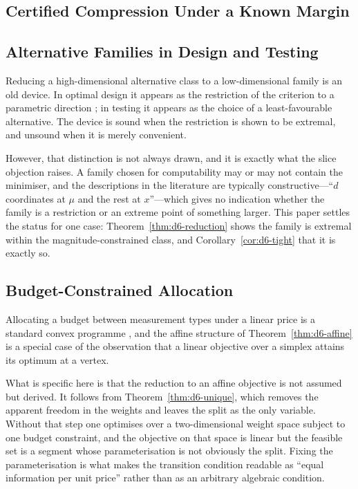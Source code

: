 \documentclass[conference]{IEEEtran}
\theoremstyle{definition}
\begin{document}
\subsection{Certified Compression Under a Known Margin}

\subsection{Alternative Families in Design and Testing}

Reducing a high-dimensional alternative class to a low-dimensional family is an old device.
In optimal design it appears as the restriction of the criterion to a parametric direction
\cite{pukelsheim2006,fedorov1972}; in testing it appears as the choice of a least-favourable
alternative. The device is sound when the restriction is shown to be extremal, and unsound
when it is merely convenient.

However, that distinction is not always drawn, and it is exactly what the slice objection
raises. A family chosen for computability may or may not contain the minimiser, and the
descriptions in the literature are typically constructive---``$d$ coordinates at $\mu$ and
the rest at $x$''---which gives no indication whether the family is a restriction or an
extreme point of something larger. This paper settles the status for one case:
Theorem~\ref{thm:d6-reduction} shows the family is extremal within the magnitude-constrained
class, and Corollary~\ref{cor:d6-tight} that it is exactly so.

\subsection{Budget-Constrained Allocation}

Allocating a budget between measurement types under a linear price is a standard convex
programme \cite{boyd2004}, and the affine structure of Theorem~\ref{thm:d6-affine} is a special
case of the observation that a linear objective over a simplex attains its optimum at a
vertex.

What is specific here is that the reduction to an affine objective is not assumed but
derived. It follows from Theorem~\ref{thm:d6-unique}, which removes the apparent freedom in the
weights and leaves the split as the only variable. Without that step one optimises over a
two-dimensional weight space subject to one budget constraint, and the objective on that
space is linear but the feasible set is a segment whose parameterisation is not obviously the
split. Fixing the parameterisation is what makes the transition condition readable as ``equal
information per unit price'' rather than as an arbitrary algebraic condition.
\end{document}
